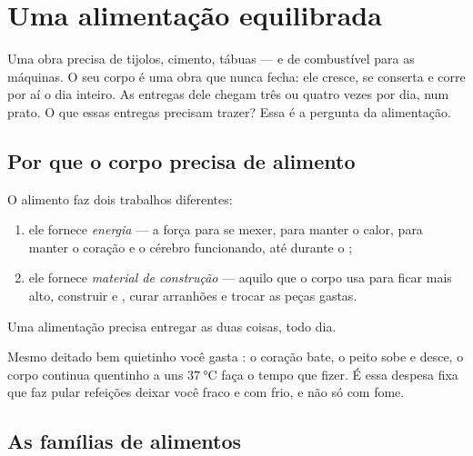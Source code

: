 \chapter{Uma alimentação equilibrada}\label{ch:g3:balanced-diet}

Uma obra precisa de tijolos, cimento, tábuas --- e de combustível
para as máquinas. O seu corpo é uma obra que nunca fecha: ele
cresce, se conserta e corre por aí o dia inteiro. As entregas dele
chegam três ou quatro vezes por dia, num prato. O que essas entregas
precisam trazer? Essa é a pergunta da alimentação.

\section{Por que o corpo precisa de alimento}

\begin{proposition}\label{prop:g3:balanced-diet:jobs}
O alimento faz dois trabalhos diferentes:
\begin{enumerate}
  \item ele fornece \emph{energia} ---
        a força para se mexer, para manter o calor, para manter o
        coração e o cérebro funcionando, até durante o ;
  \item ele fornece \emph{material de construção} --- aquilo que o
        corpo usa para ficar mais alto, construir  e ,
        curar arranhões e trocar as peças gastas.
\end{enumerate}
Uma alimentação precisa entregar as duas coisas, todo dia.
\end{proposition}
\admitted

\begin{example}\label{ex:g3:balanced-diet:rest}
Mesmo deitado bem quietinho você gasta : o coração bate, o
peito sobe e desce, o corpo continua quentinho a uns
$\qty{37}{\degreeCelsius}$ faça o tempo que fizer. É essa despesa
fixa que faz pular refeições deixar você fraco e com frio, e não só
com fome.
\end{example}

\section{As famílias de alimentos}

